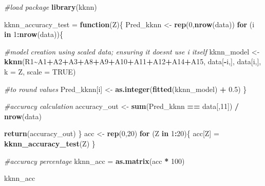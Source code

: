 \documentclass[
]{article}
\newenvironment{Shaded}{\begin{snugshade}}{\end{snugshade}}
\newcommand{\AttributeTok}[1]{\textcolor[rgb]{0.13,0.29,0.53}{#1}}
\newcommand{\CommentTok}[1]{\textcolor[rgb]{0.56,0.35,0.01}{\textit{#1}}}
\newcommand{\ConstantTok}[1]{\textcolor[rgb]{0.56,0.35,0.01}{#1}}
\newcommand{\ControlFlowTok}[1]{\textcolor[rgb]{0.13,0.29,0.53}{\textbf{#1}}}
\newcommand{\DecValTok}[1]{\textcolor[rgb]{0.00,0.00,0.81}{#1}}
\newcommand{\FloatTok}[1]{\textcolor[rgb]{0.00,0.00,0.81}{#1}}
\newcommand{\FunctionTok}[1]{\textcolor[rgb]{0.13,0.29,0.53}{\textbf{#1}}}
\newcommand{\NormalTok}[1]{#1}
\newcommand{\OtherTok}[1]{\textcolor[rgb]{0.56,0.35,0.01}{#1}}
\newcommand{\SpecialCharTok}[1]{\textcolor[rgb]{0.81,0.36,0.00}{\textbf{#1}}}
\begin{document}
\begin{Shaded}
\begin{Highlighting}[]
\CommentTok{\#load package }
\FunctionTok{library}\NormalTok{(kknn)}

\NormalTok{kknn\_accuracy\_test }\OtherTok{=} \ControlFlowTok{function}\NormalTok{(Z)\{}
\NormalTok{  Pred\_kknn }\OtherTok{\textless{}{-}} \FunctionTok{rep}\NormalTok{(}\DecValTok{0}\NormalTok{,}\FunctionTok{nrow}\NormalTok{(data))}
  \ControlFlowTok{for}\NormalTok{ (i }\ControlFlowTok{in} \DecValTok{1}\SpecialCharTok{:}\FunctionTok{nrow}\NormalTok{(data))\{}
    
    \CommentTok{\#model creation using scaled data; ensuring it doesnt use i itself }
\NormalTok{    kknn\_model }\OtherTok{\textless{}{-}} \FunctionTok{kknn}\NormalTok{(R1}\SpecialCharTok{\textasciitilde{}}\NormalTok{A1}\SpecialCharTok{+}\NormalTok{A2}\SpecialCharTok{+}\NormalTok{A3}\SpecialCharTok{+}\NormalTok{A8}\SpecialCharTok{+}\NormalTok{A9}\SpecialCharTok{+}\NormalTok{A10}\SpecialCharTok{+}\NormalTok{A11}\SpecialCharTok{+}\NormalTok{A12}\SpecialCharTok{+}\NormalTok{A14}\SpecialCharTok{+}\NormalTok{A15, data[}\SpecialCharTok{{-}}\NormalTok{i,], data[i,], }\AttributeTok{k =}\NormalTok{ Z, }\AttributeTok{scale =} \ConstantTok{TRUE}\NormalTok{)}
    
    \CommentTok{\#to round values}
\NormalTok{    Pred\_kknn[i] }\OtherTok{\textless{}{-}} \FunctionTok{as.integer}\NormalTok{(}\FunctionTok{fitted}\NormalTok{(kknn\_model) }\SpecialCharTok{+} \FloatTok{0.5}\NormalTok{)}
\NormalTok{  \}}
  
  \CommentTok{\#accuracy calculation}
\NormalTok{  accuracy\_out }\OtherTok{\textless{}{-}} \FunctionTok{sum}\NormalTok{(Pred\_kknn }\SpecialCharTok{==}\NormalTok{ data[,}\DecValTok{11}\NormalTok{]) }\SpecialCharTok{/} \FunctionTok{nrow}\NormalTok{(data)}
  
  \FunctionTok{return}\NormalTok{(accuracy\_out)}
\NormalTok{\}}
\NormalTok{acc }\OtherTok{\textless{}{-}} \FunctionTok{rep}\NormalTok{(}\DecValTok{0}\NormalTok{,}\DecValTok{20}\NormalTok{) }
\ControlFlowTok{for}\NormalTok{ (Z }\ControlFlowTok{in} \DecValTok{1}\SpecialCharTok{:}\DecValTok{20}\NormalTok{)\{}
\NormalTok{  acc[Z] }\OtherTok{=} \FunctionTok{kknn\_accuracy\_test}\NormalTok{(Z)}
\NormalTok{\}}

\CommentTok{\#accuracy percentage }
\NormalTok{kknn\_acc }\OtherTok{=} \FunctionTok{as.matrix}\NormalTok{(acc }\SpecialCharTok{*} \DecValTok{100}\NormalTok{)}

\NormalTok{kknn\_acc}
\end{Highlighting}
\end{Shaded}
\end{document}

